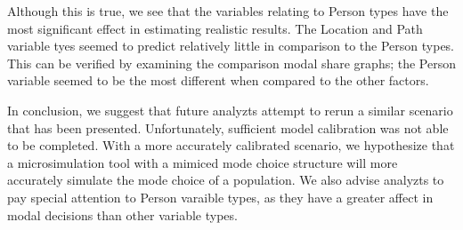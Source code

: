 \documentclass[3p, authoryear]{elsarticle} %
\begin{document}
Although this is true, we see that the variables relating to Person types have the most significant effect in estimating realistic results. The Location and Path variable tyes seemed to predict relatively little in comparison to the Person types. This can be verified by examining the comparison modal share graphs; the Person variable seemed to be the most different when compared to the other factors.

In conclusion, we suggest that future analyzts attempt to rerun a similar scenario that has been presented. Unfortunately, sufficient model calibration was not able to be completed. With a more accurately calibrated scenario, we hypothesize that a microsimulation tool with a mimiced mode choice structure will more accurately simulate the mode choice of a population. We also advise analyzts to pay special attention to Person varaible types, as they have a greater affect in modal decisions than other variable types.


\end{document}
